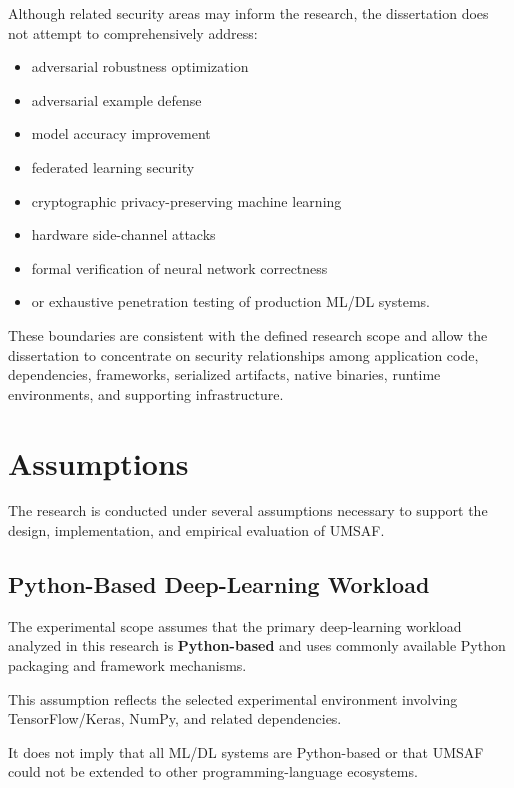 \documentclass[
  12pt,
  letterpaper,
  oneside]{report}
\providecommand{\tightlist}{%
  \setlength{\itemsep}{0pt}\setlength{\parskip}{0pt}}
\begin{document}
Although related security areas may inform the research, the
dissertation does not attempt to comprehensively address:

\begin{itemize}
\tightlist
\item
  adversarial robustness optimization
\item
  adversarial example defense
\item
  model accuracy improvement
\item
  federated learning security
\item
  cryptographic privacy-preserving machine learning
\item
  hardware side-channel attacks
\item
  formal verification of neural network correctness
\item
  or exhaustive penetration testing of production ML/DL systems.
\end{itemize}

These boundaries are consistent with the defined research scope and
allow the dissertation to concentrate on security relationships among
application code, dependencies, frameworks, serialized artifacts, native
binaries, runtime environments, and supporting infrastructure.

\section{Assumptions}\label{132-assumptions}

The research is conducted under several assumptions necessary to support
the design, implementation, and empirical evaluation of UMSAF.

\subsection{Python-Based Deep-Learning Workload}\label{1321-python-based-deep-learning-workload}

The experimental scope assumes that the primary deep-learning workload
analyzed in this research is \textbf{Python-based} and uses commonly
available Python packaging and framework mechanisms.

This assumption reflects the selected experimental environment involving
TensorFlow/Keras, NumPy, and related dependencies.

It does not imply that all ML/DL systems are Python-based or that UMSAF
could not be extended to other programming-language ecosystems.
\end{document}
